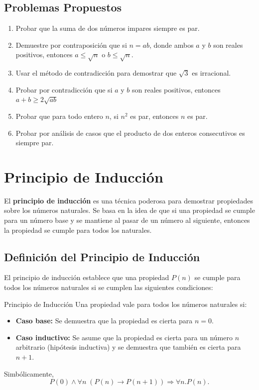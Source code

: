 \subsection{Problemas Propuestos}

\begin{enumerate}
    \item Probar que la suma de dos números impares siempre es par.
    \item Demuestre por contraposición que si $n = ab$, donde ambos $a$ y $b$ son reales positivos, entonces $a \leq \sqrt{n}$ o $b \leq \sqrt{n}$.
    \item Usar el método de contradicción para demostrar que $\sqrt{3}$ es irracional.
    \item Probar por contradicción que si $a$ y $b$ son reales positivos, entonces $a+b \geq 2\sqrt{ab}$
    \item Probar que para todo entero $n$, si $n^2$ es par, entonces $n$ es par.
    \item Probar por análisis de casos que el producto de dos enteros consecutivos es siempre par.
\end{enumerate}



\section{Principio de Inducción}

El \textbf{principio de inducción} es una técnica poderosa para demostrar propiedades sobre los números naturales. Se basa en la idea de que si una propiedad se cumple para un número base y se mantiene al pasar de un número al siguiente, entonces la propiedad se cumple para todos los naturales.

\subsection{Definición del Principio de Inducción}

El principio de inducción establece que una propiedad $P(n)$ se cumple para todos los números naturales si se cumplen las siguientes condiciones:

\begin{definitionblock}{Principio de Inducción}
Una propiedad vale para todos los números naturales si:
\begin{itemize}
    \item \textbf{Caso base:} Se demuestra que la propiedad es cierta para $n = 0$.
    \item \textbf{Caso inductivo:} Se asume que la propiedad es cierta para un número $n$ arbitrario (hipótesis inductiva) y se demuestra que también es cierta para $n+1$.
\end{itemize}

Simbólicamente,
$$ P(0) \wedge \forall n \; (P(n) \rightarrow P(n+1)) \Rightarrow \forall n. P(n). $$
\end{definitionblock}

